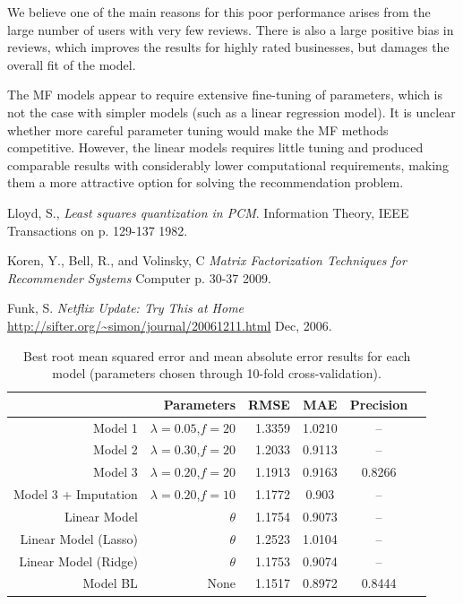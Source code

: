\documentclass[12pt]{article}
\begin{document}
We believe one of the main reasons for this poor performance arises from the large number of users with very few reviews. There is also a large positive bias in reviews, which improves the results for highly rated businesses, but damages the overall fit of the model. 

The MF models appear to require extensive fine-tuning of parameters, which is not the case with simpler models (such as a linear regression model). It is unclear whether more careful parameter tuning would make the MF methods competitive. However, the linear models requires little tuning and produced comparable results with considerably lower computational requirements, making them a more attractive option for solving the recommendation problem.

\begin{thebibliography}{9}

  Lloyd, S.,
  \emph{Least squares quantization in PCM}.
  Information Theory, IEEE Transactions on
  p. 129-137
  1982.

  Koren, Y., Bell, R., and Volinsky, C
  \emph{Matrix Factorization Techniques for Recommender Systems}
  Computer
  p. 30-37
  2009.

  Funk, S.
  \emph{Netflix Update: Try This at Home}
  \url{http://sifter.org/~simon/journal/20061211.html}
  Dec, 2006.

\end{thebibliography}



\newpage

\begin{table}[htbp]
  \centering
  \caption{Best root mean squared error and mean absolute error results for each model (parameters chosen through 10-fold cross-validation).}
    \begin{tabular}{rrrccc}
    \toprule
          & Parameters & RMSE  & MAE & Precision \\
    \midrule
    Model 1 & $\lambda=0.05$,$f=20$ & 1.3359 & 1.0210 & -- \\
    Model 2 & $\lambda=0.30$,$f=20$ & 1.2033 & 0.9113 & --\\
    Model 3 & $\lambda=0.20$,$f=20$ & 1.1913 & 0.9163 & 0.8266\\
    Model 3 + Imputation & $\lambda=0.20$,$f=10$ & 1.1772 & 0.903  & --\\
    Linear Model & $\theta$ & 1.1754 & 0.9073 & --\\
    Linear Model (Lasso) & $\theta$ & 1.2523 & 1.0104 & -- \\
    Linear Model (Ridge) & $\theta$ & 1.1753 & 0.9074 & --\\
    Model BL & None & 1.1517 & 0.8972 & 0.8444 \\
    \bottomrule
    \end{tabular}%
  \label{tab:results}%
\end{table}%
\end{document}
